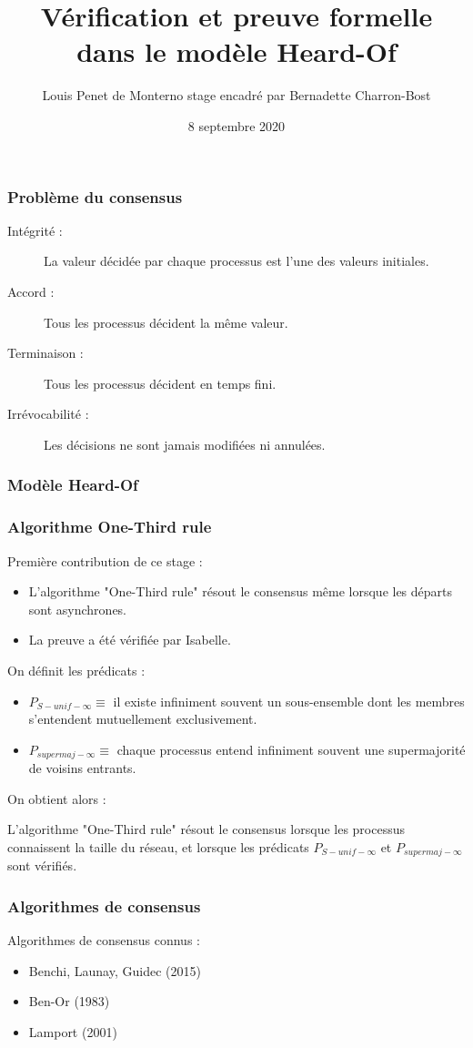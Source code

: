 \documentclass{beamer}
\title{Vérification et preuve formelle dans le modèle Heard-Of}
\date{8 septembre 2020}
\author{Louis Penet de Monterno \linebreak \scriptsize{stage encadré par Bernadette Charron-Bost}}
\institute{LIX}
\begin{document}
\begin{frame}
\frametitle{Problème du consensus}
\begin{description}
	\item[Intégrité :] La valeur décidée par chaque processus est l'une des valeurs initiales.
	\item[Accord :] Tous les processus décident la même valeur.
	\item[Terminaison :] Tous les processus décident en temps fini.
	\item[Irrévocabilité :] Les décisions ne sont jamais modifiées ni annulées.
\end{description}
\end{frame}

\begin{frame}
\frametitle{Modèle Heard-Of}
\end{frame}

\begin{frame}
\frametitle{Algorithme One-Third rule}
Première contribution de ce stage :
\begin{itemize}
	\item L'algorithme "One-Third rule" résout le consensus même lorsque les départs sont asynchrones.
	\item La preuve a été vérifiée par Isabelle.
\end{itemize}
\tiny{
On définit les prédicats :
\begin{itemize}
	\item $P_{S-unif-\infty} \equiv$ il existe infiniment souvent un sous-ensemble dont les membres s'entendent mutuellement exclusivement.
	\item $P_{supermaj-\infty} \equiv$ chaque processus entend infiniment souvent une supermajorité de voisins entrants.
\end{itemize}
On obtient alors :
\begin{theorem}
	L'algorithme "One-Third rule" résout  le consensus lorsque les processus connaissent la taille du réseau,
	et lorsque les prédicats $P_{S-unif-\infty}$ et $P_{supermaj-\infty}$ sont vérifiés.
\end{theorem}}
\end{frame}

\begin{frame}
\frametitle{Algorithmes de consensus}
Algorithmes de consensus connus :
	\begin{itemize}
		\item{ Benchi, Launay, Guidec (2015)}
		\item{ Ben-Or (1983)}
		\item{ Lamport (2001)}
	\end{itemize}
\end{frame}
\end{document}
